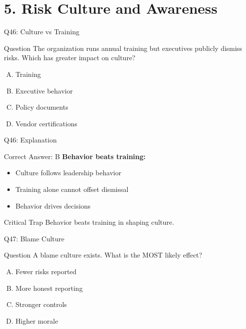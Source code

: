 \documentclass{beamer}
\begin{document}
	\section{5. Risk Culture and Awareness}
	
	\begin{frame}{Q46: Culture vs Training}
		\begin{block}{Question}
			The organization runs annual training but executives publicly dismiss risks. Which has greater impact on culture?
		\end{block}
		\begin{enumerate}[(A)]
			\item Training
			\item Executive behavior
			\item Policy documents
			\item Vendor certifications
		\end{enumerate}
	\end{frame}
	
	\begin{frame}{Q46: Explanation}
		\begin{block}{Correct Answer: B}
			\textbf{Behavior beats training:}
			\begin{itemize}
				\item Culture follows leadership behavior
				\item Training alone cannot offset dismissal
				\item Behavior drives decisions
			\end{itemize}
		\end{block}
		\begin{alertblock}{Critical Trap}
			Behavior beats training in shaping culture.
		\end{alertblock}
	\end{frame}
	
	\begin{frame}{Q47: Blame Culture}
		\begin{block}{Question}
			A blame culture exists. What is the MOST likely effect?
		\end{block}
		\begin{enumerate}[(A)]
			\item Fewer risks reported
			\item More honest reporting
			\item Stronger controls
			\item Higher morale
		\end{enumerate}
	\end{frame}
	
\end{document}
